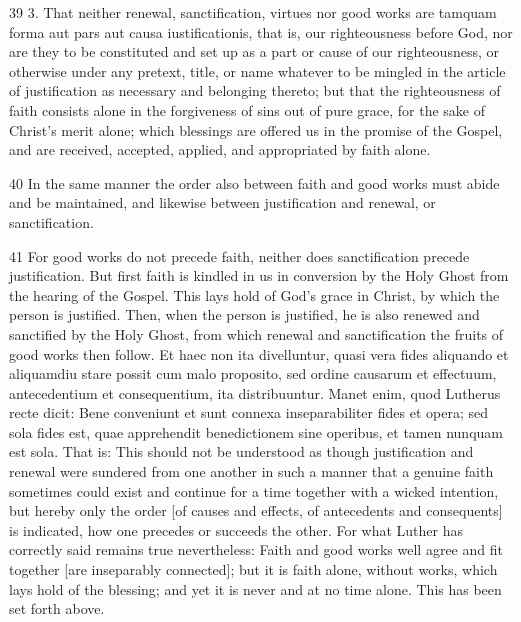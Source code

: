 39 3. That neither renewal, sanctification, virtues nor good works are tamquam forma aut pars aut causa iustificationis, that is, our righteousness before God, nor are they to be constituted and set up as a part or cause of our righteousness, or otherwise under any pretext, title, or name whatever to be mingled in the article of justification as necessary and belonging thereto; but that the righteousness of faith consists alone in the forgiveness of sins out of pure grace, for the sake of Christ’s merit alone; which blessings are offered us in the promise of the Gospel, and are received, accepted, applied, and appropriated by faith alone.

40 In the same manner the order also between faith and good works must abide and be maintained, and likewise between justification and renewal, or sanctification.

41 For good works do not precede faith, neither does sanctification precede justification. But first faith is kindled in us in conversion by the Holy Ghost from the hearing of the Gospel. This lays hold of God’s grace in Christ, by which the person is justified. Then, when the person is justified, he is also renewed and sanctified by the Holy Ghost, from which renewal and sanctification the fruits of good works then follow. Et haec non ita divelluntur, quasi vera fides aliquando et aliquamdiu stare possit cum malo proposito, sed ordine causarum et effectuum, antecedentium et consequentium, ita distribuuntur. Manet enim, quod Lutherus recte dicit: Bene conveniunt et sunt connexa inseparabiliter fides et opera; sed sola fides est, quae apprehendit benedictionem sine operibus, et tamen nunquam est sola. That is: This should not be understood as though justification and renewal were sundered from one another in such a manner that a genuine faith sometimes could exist and continue for a time together with a wicked intention, but hereby only the order [of causes and effects, of antecedents and consequents] is indicated, how one precedes or succeeds the other. For what Luther has correctly said remains true nevertheless: Faith and good works well agree and fit together [are inseparably connected]; but it is faith alone, without works, which lays hold of the blessing; and yet it is never and at no time alone. This has been set forth above.

